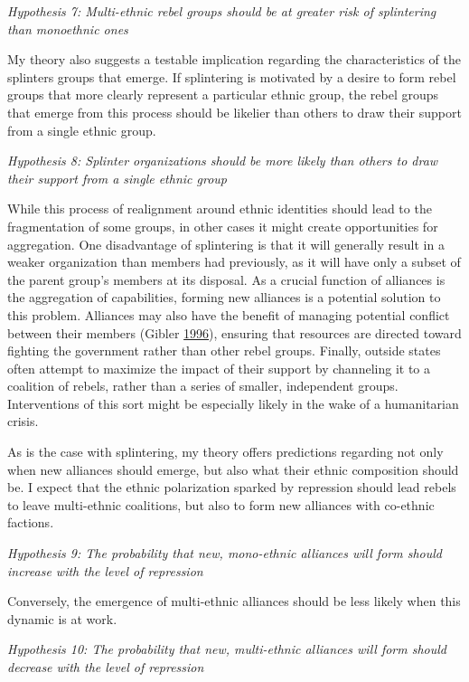 \documentclass[12pt,]{book}
\theoremstyle{definition}
\theoremstyle{definition}
\theoremstyle{remark}
\begin{document}
\emph{Hypothesis 7: Multi-ethnic rebel groups should be at greater risk
of splintering than monoethnic ones}

My theory also suggests a testable implication regarding the
characteristics of the splinters groups that emerge. If splintering is
motivated by a desire to form rebel groups that more clearly represent a
particular ethnic group, the rebel groups that emerge from this process
should be likelier than others to draw their support from a single
ethnic group.

\emph{Hypothesis 8: Splinter organizations should be more likely than
others to draw their support from a single ethnic group}

While this process of realignment around ethnic identities should lead
to the fragmentation of some groups, in other cases it might create
opportunities for aggregation. One disadvantage of splintering is that
it will generally result in a weaker organization than members had
previously, as it will have only a subset of the parent group's members
at its disposal. As a crucial function of alliances is the aggregation
of capabilities, forming new alliances is a potential solution to this
problem. Alliances may also have the benefit of managing potential
conflict between their members (Gibler
\protect\hyperlink{ref-Gibler1996}{1996}), ensuring that resources are
directed toward fighting the government rather than other rebel groups.
Finally, outside states often attempt to maximize the impact of their
support by channeling it to a coalition of rebels, rather than a series
of smaller, independent groups. Interventions of this sort might be
especially likely in the wake of a humanitarian crisis.

As is the case with splintering, my theory offers predictions regarding
not only when new alliances should emerge, but also what their ethnic
composition should be. I expect that the ethnic polarization sparked by
repression should lead rebels to leave multi-ethnic coalitions, but also
to form new alliances with co-ethnic factions.

\emph{Hypothesis 9: The probability that new, mono-ethnic alliances will
form should increase with the level of repression}

Conversely, the emergence of multi-ethnic alliances should be less
likely when this dynamic is at work.

\emph{Hypothesis 10: The probability that new, multi-ethnic alliances
will form should decrease with the level of repression}
\end{document}
